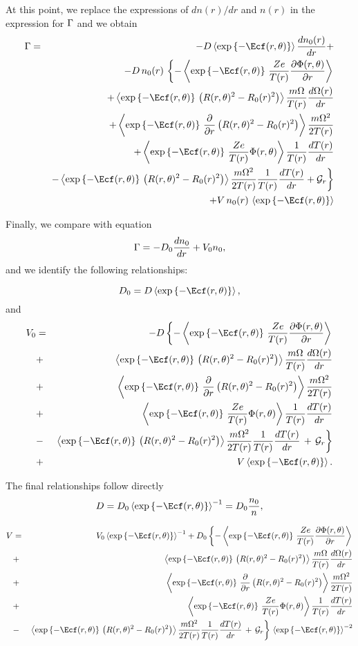 At this point, we replace the expressions of $d n(r) /d r$ and $n(r)$ in the expression for $\Gamma$ and
we obtain
\begin{eqnarray*}
\Gfs &=& -D \left \langle \expargs \right \rangle \noder  + \\
& & - D\, n_0(r)\,\left\{ - \left \langle \expargs \, \frac{Ze}{T(r)} \Pparder \right \rangle \right. \\
& & + \left \langle \expargs \, \Rsqdiff \right \rangle \frac{m\Omega}{T(r)} \frac{d \Omega(r)}{d r}\\
& & + \left \langle \expargs \, \frac{\partial}{\partial r} \Rsqdiff \right \rangle \frac{m\Omega^2}{2T(r)}\\
& &
+ \left \langle \expargs \, \frac{Ze}{T(r)} \Phi(r,\theta) \right \rangle
\Tlnder \\
& & \left. - \left \langle \expargs \, \Rsqdiff \right \rangle \frac{m\Omega^2}{2T(r)} \Tlnder
+\calGr \right\}\\
& & + V \,n_0(r) \, \left \langle \expargs \right \rangle
\end{eqnarray*}

Finally, we compare with equation 
\[ \Gamma = -D_0 \frac {d n_0}{d r} + V_0 n_0, \]
and we identify the following relationships:

\[ D_0 = D \left \langle \expargs \right \rangle, \]
and
\begin{eqnarray*}
V_0 &=& - D \left\{ - \left \langle \expargs \, \frac{Ze}{T(r)} \Pparder \right \rangle \right. \\
& + &  \left \langle \expargs \, \Rsqdiff \right \rangle \frac{m\Omega}{T(r)} \frac{d \Omega(r)}{d r}\\
& + &  \left \langle \expargs \, \frac{\partial}{\partial r} \Rsqdiff \right \rangle \frac{m\Omega^2}{2T(r)}\\
& + & \left \langle \expargs \, \frac{Ze}{T(r)} \Phi(r,\theta) \right \rangle
\Tlnder \\
& - & \left. \left \langle \expargs \, \Rsqdiff \right \rangle \frac{m\Omega^2}{2T(r)} \Tlnder
\,+\, \calGr
\right\}\\
& + &  V \left \langle \expargs \right \rangle.
\end{eqnarray*}

The final relationships follow directly
\[ D = D_0 \left \langle \expargs \right \rangle^{-1} = D_0 \frac{n_0}{n}, \]

\begin{eqnarray*}
V &=& V_0 \left \langle \expargs \right \rangle^{-1} +
D_0 \left\{ - \left \langle \expargs \, \frac{Ze}{T(r)} \Pparder \right \rangle \right. \\
& + &  \left \langle \expargs \, \Rsqdiff \right \rangle \frac{m\Omega}{T(r)} \frac{d \Omega(r)}{d r}\\
& + & \left \langle \expargs \, \frac{\partial}{\partial r} \Rsqdiff \right \rangle \frac{m\Omega^2}{2T(r)}\\
& + & \left \langle \expargs \, \frac{Ze}{T(r)} \Phi(r,\theta) \right \rangle
\Tlnder \\
& - & \left. \left \langle \expargs \, \Rsqdiff \right \rangle \frac{m\Omega^2}{2T(r)} \Tlnder 
\,+\, \calGr \right\} \, \left \langle \expargs \right \rangle^{-2}
\end{eqnarray*}


